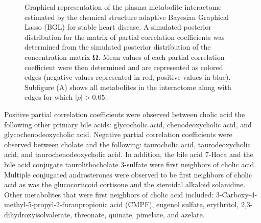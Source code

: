 \begin{DoubleSpace*}
\begin{figure}[h!]
	\caption[Add caption]{Graphical representation of the plasma metabolite interactome estimated by the chemical structure adaptive Bayesian Graphical Lasso (BGL) for stable heart disease. A simulated posterior distribution for the matrix of partial correlation coefficients was determined from the simulated posterior distribution of the concentration matrix $\boldsymbol{\Omega}$.  Mean values of each partial correlation coefficient were then determined and are represented as colored edges (negative values represented in red, positive values in blue). Subfigure (A) shows all metabolites in the interactome along with edges for which $|\rho|>0.05$.   \label{fig:stableInter} }
\end{figure}

Positive partial correlation coefficients were observed between cholic acid the following other primary bile acids: glycocholic acid, chenodeoxycholic acid, and glycochenodeoxycholic acid. Negative partial correlation coefficients were observed between cholate and the following: taurocholic acid, taurodeoxycholic acid, and taurochenodeoxycholic acid. In addition, the bile acid 7-Hoca and the bile acid conjugate taurolithocholate 3-sulfate were first neighbors of cholic acid. Multiple conjugated androsterones were observed to be first neighbors of cholic acid as was the glucocorticoid cortisone and the steroidal alkaloid solanidine. Other metabolites that were first neighbors of cholic acid included: 3-Carboxy-4-methyl-5-propyl-2-furanpropionic acid (CMPF), eugenol sulfate, erythritol, 2,3-dihydroxyisolvalerate, threonate, quinate, pimelate, and azelate.


\end{DoubleSpace*}
